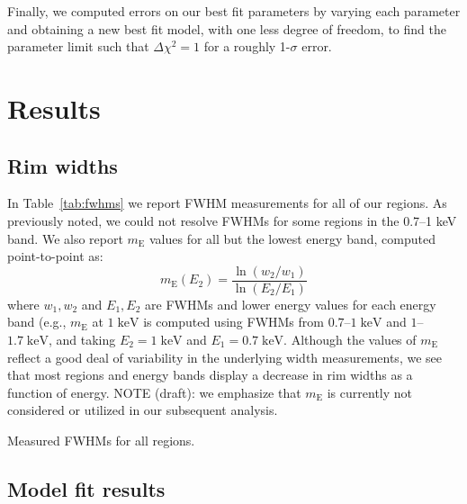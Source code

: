 \documentclass[iop, apj, numberedappendix, twocolappendix]{emulateapj}
\newcommand*{\mt}{\mathrm}
\newcommand*{\unit}[1]{\;\mt{#1}}  %
\newcommand*{\mE}{m_\mt{E}}
\begin{document}
Finally, we computed errors on our best fit parameters by varying each
parameter and obtaining a new best fit model, with one less degree of freedom,
to find the parameter limit such that $\Delta \chi^2 = 1$ for a roughly
1-$\sigma$ error.

\section{Results}

\subsection{Rim widths}
\label{sec:fwhm-results}

In Table~\ref{tab:fwhms} we report FWHM measurements for all of our regions.
As previously noted, we could not resolve FWHMs for some regions in the 0.7--1
keV band.  We also report $\mE$ values for all but the lowest energy band,
computed point-to-point as: \begin{equation} \mE(E_2) =
\frac{\ln(w_2/w_1)}{\ln(E_2/E_1)} \end{equation} where $w_1, w_2$ and $E_1,
E_2$ are FWHMs and lower energy values for each energy band (e.g., $\mE$ at $1
\unit{keV}$ is computed using FWHMs from $0.7$--$1 \unit{keV}$ and $1$--$1.7
\unit{keV}$, and taking $E_2 = 1 \unit{keV}$ and $E_1 = 0.7 \unit{keV}$.
Although the values of $\mE$ reflect a good deal of variability in the
underlying width measurements, we see that most regions and energy bands
display a decrease in rim widths as a function of energy.  NOTE (draft): we
emphasize that $\mE$ is currently not considered or utilized in our subsequent
analysis.

\begin{table*}[ht]
    \tiny
    \centering
    \caption{Measured FWHMs for all regions.\label{tab:fwhms}}
    
\end{table*}

\subsection{Model fit results}
\label{sec:fit-results}
\end{document}
